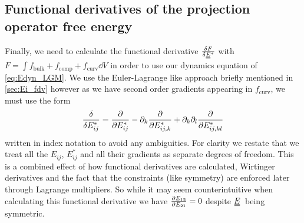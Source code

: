 \documentclass[12pt]{article}
\newcommand{\duf}[2]{\stackunder[0.5pt]{\stackunder[0.8pt]{\stackunder[1pt]{\ensuremath{#1}}{\rule{\widthof{\ensuremath{#2}}*\real{0.9}}{.1ex}}}{\rule{\widthof{\ensuremath{#2}}*\real{0.9}}{.1ex}}}{}}
\newcommand{\du}[1]{\duf{#1}{#1}}
\newcommand{\sdu}[1]{\scriptsize\du{#1}\normalsize}
\newcommand{\pp}{\ensuremath{\partial}}
\newcommand{\EE}{\ensuremath{\du{E}}}
\newcommand{\FB}{\ensuremath{f_\text{bulk}}}
\newcommand{\FC}{\ensuremath{f_\text{comp}}}
\newcommand{\FU}{\ensuremath{f_\text{curv}}}
\begin{document}
    \subsection{Functional derivatives of the projection operator free energy}
        Finally, we need to calculate the functional derivative $\fdv{F}{\sdu{E}^*}$ with $F=\int \FB + \FC + \FU \dd{V}$ in order to use our dynamics equation of \cref{eq:Edyn_LGM}.
        We use the Euler-Lagrange like approach briefly mentioned in \cref{sec:Ei_fdv} however as we have second order gradients appearing in \FU, we must use the form
        \begin{equation}
            \fdv{E_{ij}^*} = \pdv{E_{ij}^*} - \pp_k \pdv{E_{ij,k}^*} + \pp_k\pp_l \pdv{E_{ij,kl}^*}
        \end{equation}
        written in index notation to avoid any ambiguities.
        For clarity we restate that we treat all the $E_{ij}$, $E_{ij}^*$ and all their gradients as separate degrees of freedom.
        This is a combined effect of how functional derivatives are calculated, Wirtinger derivatives and the fact that the constraints (like symmetry) are enforced later through Lagrange multipliers.
        So while it may seem counterintuitive when calculating this functional derivative we have $\pdv{E_{12}}{E_{21}}=0$ despite \EE\ being symmetric.
\end{document}
